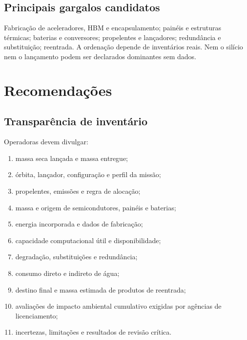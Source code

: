 \documentclass[11pt,a4paper]{article}
\begin{document}
\subsection{Principais gargalos candidatos}

Fabricação de aceleradores, HBM e encapsulamento; painéis e estruturas
térmicas; baterias e conversores; propelentes e lançadores; redundância e
substituição; reentrada. A ordenação depende de inventários reais. Nem o
silício nem o lançamento podem ser declarados dominantes sem dados.

\section{Recomendações}

\subsection{Transparência de inventário}
Operadoras devem divulgar:
\begin{enumerate}
  \item massa seca lançada e massa entregue;
  \item órbita, lançador, configuração e perfil da missão;
  \item propelentes, emissões e regra de alocação;
  \item massa e origem de semicondutores, painéis e baterias;
  \item energia incorporada e dados de fabricação;
  \item capacidade computacional útil e disponibilidade;
  \item degradação, substituições e redundância;
  \item consumo direto e indireto de água;
  \item destino final e massa estimada de produtos de reentrada;
  \item avaliações de impacto ambiental cumulativo exigidas por agências de
  licenciamento;
  \item incertezas, limitações e resultados de revisão crítica.
\end{enumerate}
\end{document}
